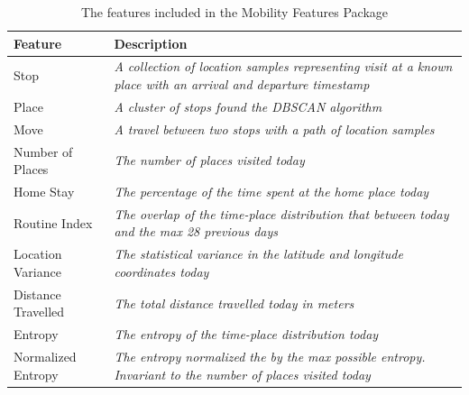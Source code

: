 \begin{table}[h]
    \centering
    \begin{tabular}{|p{}|p{}|}
\hline
\textbf{Feature}   & \textbf{Description}                                                                                                  \\ \hline
Stop               & \textit{A collection of location samples representing visit at a known place with an arrival and departure timestamp} \\ \hline
Place              & \textit{A cluster of stops found the DBSCAN algorithm}                                                                \\ \hline
Move               & \textit{A travel between two stops with a path of location samples}                                                   \\ \hline
Number of Places   & \textit{The number of places visited today}                                                                           \\ \hline
Home Stay          & \textit{The percentage of the time spent at the home place today}                                                     \\ \hline
Routine Index      & \textit{The overlap of the time-place distribution that between today and the max 28 previous days}                   \\ \hline
Location Variance  & \textit{The statistical variance in the latitude and longitude coordinates today}                                     \\ \hline
Distance Travelled & \textit{The total distance travelled today in meters}                                                                 \\ \hline
Entropy            & \textit{The entropy of the time-place distribution today}                                                             \\ \hline
Normalized Entropy & \textit{The entropy normalized the by the max possible entropy. Invariant to the number of places visited today}      \\ \hline
\end{tabular}
    \caption{The features included in the Mobility Features Package}
    \label{tab:features-nilsson}
\end{table}

